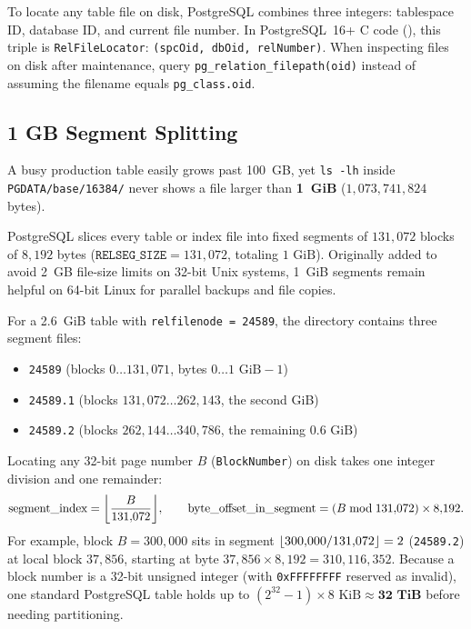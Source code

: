 To locate any table file on disk, PostgreSQL combines three integers: tablespace ID, database ID, and current file number. In PostgreSQL~16+ C code (), this triple is \texttt{RelFileLocator}: \texttt{(spcOid, dbOid, relNumber)}. When inspecting files on disk after maintenance, query \texttt{pg\_relation\_filepath(oid)} instead of assuming the filename equals \texttt{pg\_class.oid}.

\subsection{1 GB Segment Splitting}

A busy production table easily grows past 100~GB, yet \texttt{ls -lh} inside \texttt{PGDATA/base/16384/} never shows a file larger than \textbf{1~GiB} ($1{,}073{,}741{,}824$ bytes).

PostgreSQL slices every table or index file into fixed segments of $131{,}072$ blocks of $8{,}192$ bytes ($\texttt{RELSEG\_SIZE} = 131{,}072$, totaling $1\text{ GiB}$). Originally added to avoid 2~GB file-size limits on 32-bit Unix systems, 1~GiB segments remain helpful on 64-bit Linux for parallel backups and file copies.

For a 2.6~GiB table with \texttt{relfilenode = 24589}, the directory contains three segment files:
\begin{itemize}
  \item \texttt{24589} \quad (blocks $0 \dots 131{,}071$, bytes $0 \dots 1\text{ GiB} - 1$)
  \item \texttt{24589.1} \quad (blocks $131{,}072 \dots 262{,}143$, the second GiB)
  \item \texttt{24589.2} \quad (blocks $262{,}144 \dots 340{,}786$, the remaining $0.6\text{ GiB}$)
\end{itemize}
Locating any 32-bit page number $B$ (\texttt{BlockNumber}) on disk takes one integer division and one remainder:
\[
  \text{segment\_index} = \floor*{\frac{B}{131{,}072}},
  \qquad
  \text{byte\_offset\_in\_segment} = (B \bmod 131{,}072) \times 8{,}192.
\]
For example, block $B = 300{,}000$ sits in segment $\lfloor300{,}000 / 131{,}072\rfloor = 2$ (\texttt{24589.2}) at local block $37{,}856$, starting at byte $37{,}856 \times 8{,}192 = 310{,}116{,}352$. Because a block number is a 32-bit unsigned integer (with \texttt{0xFFFFFFFF} reserved as invalid), one standard PostgreSQL table holds up to $(2^{32} - 1) \times 8\text{ KiB} \approx \mathbf{32\text{ TiB}}$ before needing partitioning.

